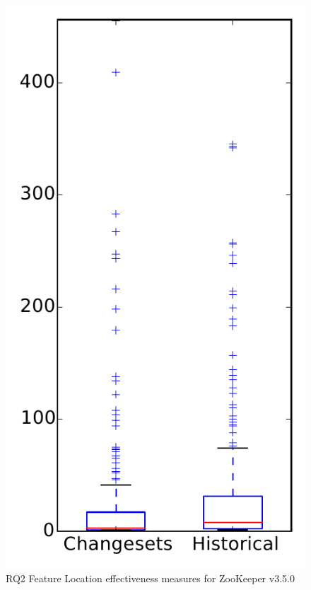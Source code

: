 
\begin{figure}
\centering
\includegraphics[height=0.4\textheight]{figures/flt/rq2_zookeeper}
\caption{RQ2 Feature Location effectiveness measures for ZooKeeper v3.5.0}
\label{fig:flt:rq2:zookeeper}
\end{figure}
